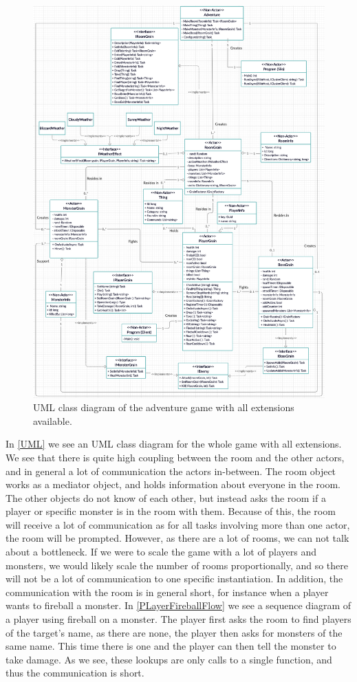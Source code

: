 \begin{figure}[H]
	\centering
	\includegraphics[width=\linewidth]{Materials/Adventuregame/ClassDiagram}
	\caption{UML class diagram of the adventure game with all extensions available.}
	\label{UML}
\end{figure}
In \autoref{UML} we see an UML class diagram for the whole game with all extensions. We see that there is quite high coupling between the room and the other actors, and in general a lot of communication the actors in-between. The room object works as a mediator object, and holds information about everyone in the room. The other objects do not know of each other, but instead asks the room if a player or specific monster is in the room with them. Because of this, the room will receive a lot of communication as for all tasks involving more than one actor, the room will be prompted. However, as there are a lot of rooms, we can not talk about a bottleneck. If we were to scale the game with a lot of players and monsters, we would likely scale the number of rooms proportionally, and so there will not be a lot of communication to one specific instantiation. In addition, the communication with the room is in general short, for instance when a player wants to fireball a monster. In \autoref{PLayerFireballFlow} we see a sequence diagram of a player using fireball on a monster. The player first asks the room to find players of the target's name, as there are none, the player then asks for monsters of the same name. This time there is one and the player can then tell the monster to take damage. As we see, these lookups are only calls to a single function, and thus the communication is short.\\
